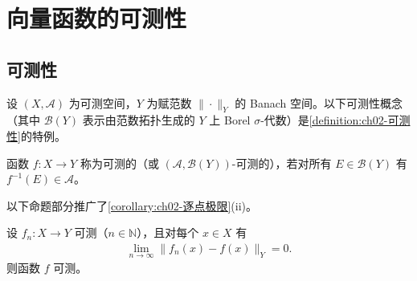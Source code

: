 \documentclass[../../main.tex]{subfiles}%
\begin{document}
\section{向量函数的可测性}\label{section:ch04-可测性}

\subsection{可测性}\label{subsection:ch04-可测性}

设 $(X,\mathcal{A})$ 为可测空间，$Y$ 为赋范数 $\|\cdot\|_Y$ 的 Banach 空间。以下可测性概念（其中 $\mathcal{B}(Y)$ 表示由范数拓扑生成的 $Y$ 上 Borel $\sigma$-代数）是\cref{definition:ch02-可测性}的特例。

\begin{definition}[向量函数的可测性]\label{definition:ch04-可测性}
函数 $f:X\to Y$ 称为可测的（或 $(\mathcal{A},\mathcal{B}(Y))$-可测的），若对所有 $E\in\mathcal{B}(Y)$ 有 $f^{-1}(E)\in\mathcal{A}$。
\end{definition}

以下命题部分推广了\cref{corollary:ch02-逐点极限}(ii)。

\begin{proposition}[逐点极限的可测性]\label{proposition:ch04-逐点极限可测}\label{proposition:ch04-可测性}
设 $f_n:X\to Y$ 可测（$n\in\mathbb{N}$），且对每个 $x\in X$ 有
\begin{align}
\lim_{n\to\infty}\|f_n(x)-f(x)\|_Y=0. \label{align:ch04-4.1}
\end{align}
则函数 $f$ 可测。
\end{proposition}
\end{document}
